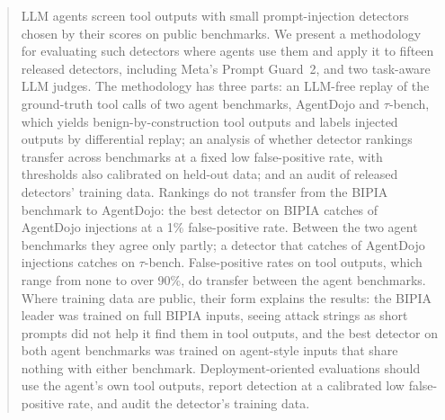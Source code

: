 \begin{abstract}
LLM agents screen tool outputs with small prompt-injection detectors chosen by their scores on public benchmarks. We present a methodology for evaluating such detectors where agents use them and apply it to fifteen released detectors, including Meta's Prompt Guard~2, and two task-aware LLM judges. The methodology has three parts: an LLM-free replay of the ground-truth tool calls of two agent benchmarks, AgentDojo and $\tau$-bench, which yields benign-by-construction tool outputs and labels injected outputs by differential replay; an analysis of whether detector rankings transfer across benchmarks at a fixed low false-positive rate, with thresholds also calibrated on held-out data; and an audit of released detectors' training data. Rankings do not transfer from the BIPIA benchmark to AgentDojo: the best detector on BIPIA catches \ADPGTpr of AgentDojo injections at a 1\% false-positive rate. Between the two agent benchmarks they agree only partly; a detector that catches \MPRAD of AgentDojo injections catches \TBTprPR on $\tau$-bench. False-positive rates on tool outputs, which range from none to over 90\%, do transfer between the agent benchmarks. Where training data are public, their form explains the results: the BIPIA leader was trained on full BIPIA inputs, seeing attack strings as short prompts did not help it find them in tool outputs, and the best detector on both agent benchmarks was trained on agent-style inputs that share nothing with either benchmark. Deployment-oriented evaluations should use the agent's own tool outputs, report detection at a calibrated low false-positive rate, and audit the detector's training data.
\end{abstract}
